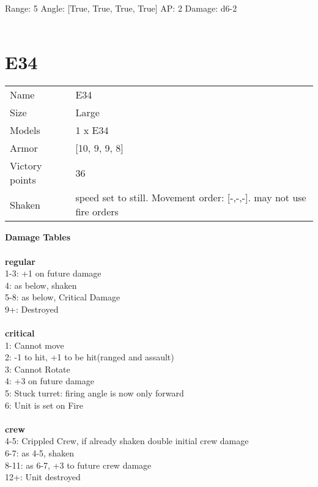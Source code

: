Range: 5  Angle: [True, True, True, True] AP: 2 Damage: d6-2 \\




 
\ \\














\pagebreak\clearpage

\section{ E34 }

\begin{tabular}{ll}
  Name & E34 \\
  Size & Large\\
  Models & 1 x E34\\
  Armor & [10, 9, 9, 8]\\
  Victory points & 36\\
  Shaken & speed set to still. Movement order: [-,-,-]. may not use fire orders\\
\end{tabular}




{\bf Damage Tables} \\
\ \\ {\bf regular } \\
1-3: +1 on future damage \\
4: as below, shaken \\
5-8: as below, Critical Damage \\
9+: Destroyed \\
\ \\ {\bf critical } \\
1: Cannot move \\
2: -1 to hit, +1 to be hit(ranged and assault) \\
3: Cannot Rotate \\
4: +3 on future damage \\
5: Stuck turret: firing angle is now only forward \\
6: Unit is set on Fire \\
\ \\ {\bf crew } \\
4-5: Crippled Crew, if already shaken double initial crew damage \\
6-7: as 4-5, shaken \\
8-11: as 6-7, +3 to future crew damage \\
12+: Unit destroyed \\


